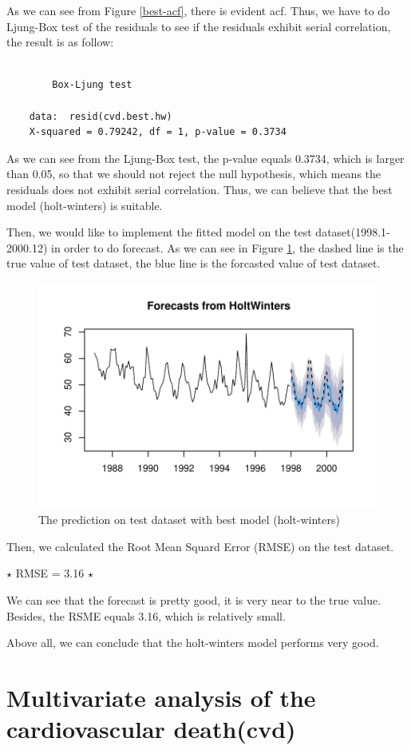 \documentclass{article}
\begin{document}
As we can see from Figure \ref{best-acf}, 
there is evident acf. Thus, we have to do Ljung-Box test of the residuals to see if the residuals exhibit serial correlation, the result is as follow:
\begin{lstlisting}
    
	    Box-Ljung test

    data:  resid(cvd.best.hw)
    X-squared = 0.79242, df = 1, p-value = 0.3734
\end{lstlisting}
As we can see from the Ljung-Box test, the p-value equals 0.3734, which is larger than 0.05, so that we should not reject the null hypothesis, which means 
the residuals does not exhibit serial correlation. Thus, we can believe that the best model (holt-winters) is suitable.

\vspace{4pt}
Then, we would like to implement the fitted model on the test dataset(1998.1-2000.12) in order to do forecast. As we can see in Figure \ref{best-forecast}, the dashed line is the true 
value of test dataset, the blue line is the forcasted value of test dataset. 
\begin{figure}[H]
    \centering
    \includegraphics[width=0.65\linewidth]{images/best-forecast}
    \caption{The prediction on test dataset with best model (holt-winters)}
    \label{best-forecast}
\end{figure}
Then, we calculated the Root Mean Squard Error (RMSE) on the test dataset. 

$\star$ RMSE = 3.16 $\star$

We can see that the forecast is pretty good, it is very near to the true value. Besides, the RSME equals 3.16, which is relatively small.
\vspace{4pt}

Above all, we can conclude that the holt-winters model performs very good.

\vspace{4pt}
\section{Multivariate analysis of the cardiovascular death(cvd)}   
\end{document}
